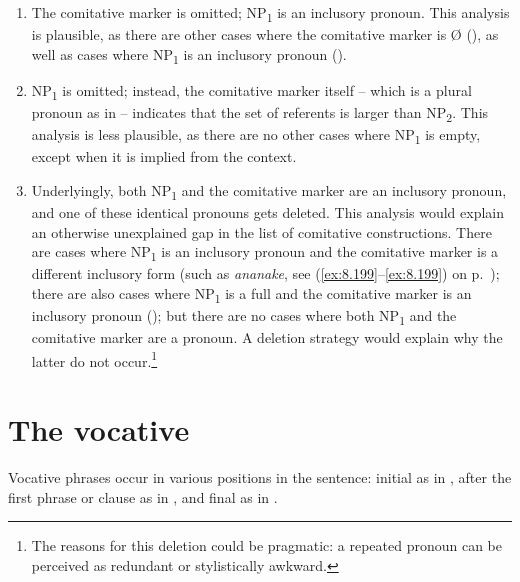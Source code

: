 \begin{enumerate}
\item 
The comitative marker is omitted; NP\textsubscript{1} is an inclusory pronoun. This analysis is plausible, as there are other cases where the comitative marker is Ø (), as well as cases where NP\textsubscript{1} is an inclusory pronoun ().

\item 
NP\textsubscript{1} is omitted; instead, the comitative marker itself – which is a plural pronoun as in  – indicates that the set of referents is larger than NP\textsubscript{2}. This analysis is less plausible, as there are no other cases where NP\textsubscript{1} is empty, except when it is implied from the context.

\item 
Underlyingly, both NP\textsubscript{1} and the comitative marker are an inclusory pronoun, and one of these identical pronouns gets deleted. This analysis would explain an otherwise unexplained gap in the list of comitative constructions. There are cases where NP\textsubscript{1} is an inclusory pronoun and the comitative marker is a different inclusory form (such as \textit{ananake}, see (\ref{ex:8.199}–\ref{ex:8.199}) on p.~\pageref{ex:8.199}); there are also cases where NP\textsubscript{1} is a full  and the comitative marker is an inclusory pronoun (); but there are no cases where both NP\textsubscript{1} and the comitative marker are a pronoun. A deletion strategy would explain why the latter do not occur.\footnote{\label{fn:452}The reasons for this deletion could be pragmatic: a repeated pronoun can be perceived as redundant or stylistically awkward.}

\end{enumerate}
\section{The vocative}\label{sec:8.11}
Vocative phrases occur in various positions in the sentence: initial as in , after the first phrase or clause as in , and final as in . 

